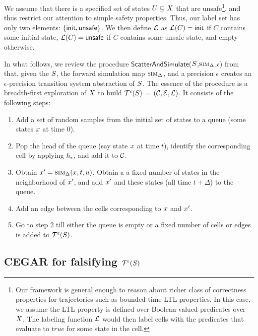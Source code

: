 We assume that there is a specified set of states $U
\subseteq X$ that are unsafe\footnote{Our framework is
general enough to reason about richer class of correctness properties
for trajectories such as bounded-time LTL properties. In this case, we
assume the LTL property is defined over Boolean-valued predicates over
$X$. The labeling function $\mathcal{L}$ would
then label cells with the predicates that evaluate to $\mathit{true}$
for some state in the cell.}, and thus restrict our attention to
simple safety properties. Thus, our label set has only two elements:
$\{\mathsf{init},\mathsf{unsafe}\}$. We then define $\mathcal{L}$ as
$\mathcal{L}(C) = \mathsf{init}$ if $C$ contains some initial state,
$\mathcal{L}(C) = \mathsf{unsafe}$ if $C$ contains some unsafe
state, and empty otherwise.

In what follows, we review the procedure
$\mathsf{ScatterAndSimulate}$($S$,$\mbox{\sc sim}_\Delta$,$\epsilon$)
from \cite{zutshi2014multiple} that, given the $S$, the forward
simulation map $\mbox{\sc sim}_\Delta$, and a precision $\epsilon$ creates an
$\epsilon$-precision transition system abstraction of $S$.  The
essence of the procedure is a breadth-first exploration of
$X$ to build $\mathcal{T}^{\epsilon}(S)$ =
$(\mathcal{C},\mathcal{E},\mathcal{L})$. It consists of the
following steps:
\begin{enumerate}
\item
Add a set of random samples from the initial set of states to a queue
(\ie some states $x$ at time $0$).
\item
Pop the head of the queue (say state $x$ at time $t$), identify
the corresponding cell by applying $h_\epsilon$, and add it to
$\mathcal{C}$. 
\item
Obtain $x' = \mbox{\sc sim}_\Delta(x, t, u)$. Obtain a a
fixed number of states in the neighborhood of $x'$, and add
$x'$ and these states (all time $t+\Delta$) to the queue. 
\item
Add an edge between the cells corresponding to $x$ and 
$x'$.
\item
Go to step 2 till either the queue is empty or a fixed number of cells
or edges is added to $\mathcal{T}^{\epsilon}(S)$.
\end{enumerate}


\subsection{CEGAR for falsifying $\mathcal{T}^{\epsilon}(S)$}

